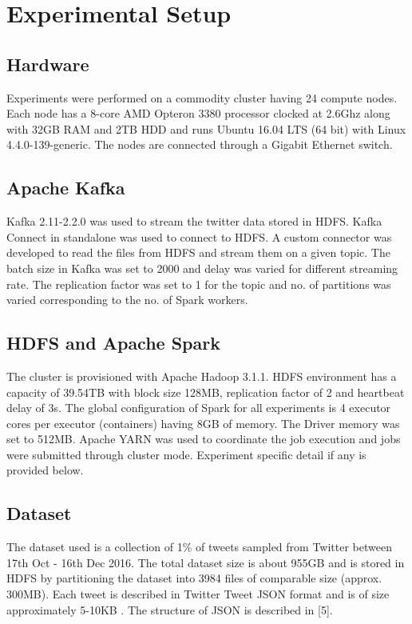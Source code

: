 \documentclass[11pt,a4paper,oneside]{article}
\begin{document}
    \section{Experimental Setup}
    
    \subsection{Hardware}
    Experiments were performed on a commodity cluster having 24 compute nodes. Each node has a 8-core AMD Opteron 3380 processor clocked at 2.6Ghz along with 32GB RAM and 2TB HDD and runs Ubuntu 16.04 LTS (64 bit) with Linux 4.4.0-139-generic. The nodes are connected through a Gigabit Ethernet switch.
    
    \subsection{Apache Kafka}
    Kafka 2.11-2.2.0 was used to stream the twitter data stored in HDFS. Kafka Connect in standalone was used to connect to HDFS. A custom connector was developed to read the files from HDFS and stream them on a given topic. The batch size in Kafka was set to 2000 and delay was varied for different streaming rate. The replication factor was set to 1 for the topic and no. of partitions was varied corresponding to the no. of Spark workers. 
    
    \subsection{HDFS and Apache Spark}
    The cluster is provisioned with Apache Hadoop 3.1.1. HDFS environment has a capacity of 39.54TB with block size 128MB, replication factor of 2 and heartbeat delay of 3s. The global configuration of Spark for all experiments is 4 executor cores per executor (containers) having 8GB of memory. The Driver memory was set to 512MB. Apache YARN was used to coordinate the job execution and jobs were submitted through cluster mode. Experiment specific detail if any is provided below.
       
    \subsection{Dataset}
    
    The dataset used is a collection of 1\% of tweets sampled from Twitter between 17th Oct - 16th Dec 2016. The total dataset size is about 955GB and is stored in HDFS by partitioning the dataset into 3984 files of comparable size (approx. 300MB). Each tweet is described in Twitter Tweet JSON format and is of size approximately 5-10KB . The structure of JSON is described in [5].
    	
\end{document}
